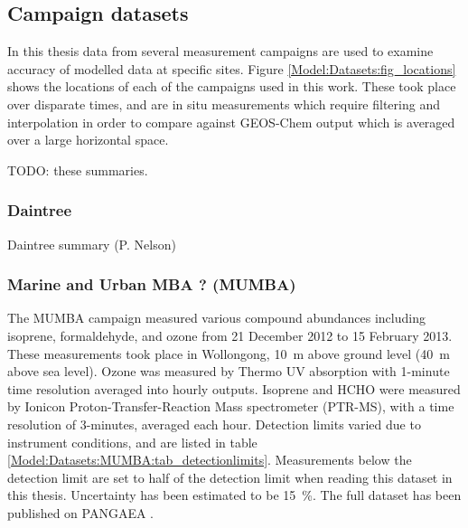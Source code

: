   
  \subsection{Campaign datasets}
  
    In this thesis data from several measurement campaigns are used to examine accuracy of modelled data at specific sites.
    Figure \ref{Model:Datasets:fig_locations} shows the locations of each of the campaigns used in this work.
    These took place over disparate times, and are in situ measurements which require filtering and interpolation in order to compare against GEOS-Chem output which is averaged over a large horizontal space.
    
    
    TODO: these summaries.
    
    \subsubsection{Daintree}
    Daintree summary (P. Nelson)
    
    \subsubsection{Marine and Urban MBA ? (MUMBA)}
    \label{Model:Datasets:MUMBA}
    
    The MUMBA campaign \parencite{PatonWalsh2013} measured various compound abundances including isoprene, formaldehyde, and ozone from 21 December 2012 to 15 February 2013.
    These measurements took place in Wollongong, 10~m above ground level (40~m above sea level).
    Ozone was measured by Thermo UV absorption with 1-minute time resolution averaged into hourly outputs.
    Isoprene and HCHO were measured by Ionicon Proton-Transfer-Reaction Mass spectrometer (PTR-MS), with a time resolution of 3-minutes, averaged each hour.
    Detection limits varied due to instrument conditions, and are listed in table \ref{Model:Datasets:MUMBA:tab_detectionlimits}.
    Measurements below the detection limit are set to half of the detection limit when reading this dataset in this thesis.
    Uncertainty has been estimated to be 15~\%.
    The full dataset has been published on PANGAEA \parencite{Guerette2017}.
    
